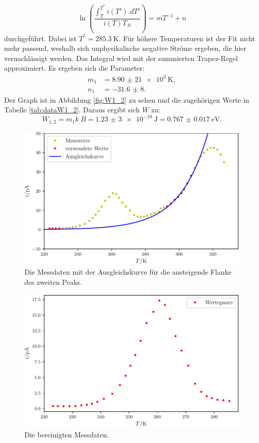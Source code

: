 \begin{equation}
\ln\left(\frac{\int_T^{T^*} i(T').dT'}{i(T) T_.0}\right) = mT^{-1}+n \label{eq:reg3}
\end{equation}
durchgeführt. Dabei ist $T^*=\SI{285,3}{\kelvin}$. Für höhere Temperaturen ist der Fit nicht mehr passend, weshalb sich unphysikalische negative Ströme ergeben, die hier vernachlässigt werden. Das Integral wird mit der summierten Trapez-Regel approximiert. Es ergeben sich die Parameter:
\begin{align*}
m_1&=\SI{8,90(21)e3}{\kelvin},\\
n_1&=\num{-31,6(8)}\text{.}
\end{align*}
Der Graph ist in Abbildung \ref{fig:W1_2} zu sehen und die zugehörigen Werte in Tabelle \ref{tab:dataW1_2}.
Daraus ergibt sich $W$ zu:
\[
W_{1,2} = m_1 k_.B =\SI{1,23(3)e-19}{\joule}=\SI{0.767(17)}{\electronvolt}\text{.}
\]

\begin{figure}
	\centering
	\includegraphics[width=\linewidth-60pt,height=\textheight-60pt,keepaspectratio]{content/images/plot1exp.pdf}
	\caption{Die Messdaten mit der Ausgleichskurve für die ansteigende Flanke des zweiten Peaks.}
	\label{fig:plot1exp}
\end{figure}

\begin{figure}
	\centering
	\includegraphics[width=\linewidth-60pt,height=\textheight-60pt,keepaspectratio]{content/images/bereinigt1.pdf}
	\caption{Die bereinigten Messdaten.}
	\label{fig:bereinigt1}
\end{figure}

